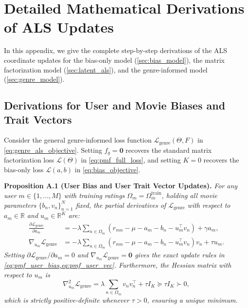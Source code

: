 \documentclass{article}
\theoremstyle{plain}
\theoremstyle{definition}
\begin{document}



\newpage
\appendix
\onecolumn

\section{Detailed Mathematical Derivations of ALS Updates}
\label{app:derivations}

In this appendix, we give the complete step-by-step derivations of the ALS coordinate updates for the bias-only model (\cref{sec:bias_model}), the matrix factorization model (\cref{sec:latent_als}), and the genre-informed model (\cref{sec:genre_model}).

\subsection{Derivations for User and Movie Biases and Trait Vectors}

Consider the general genre-informed loss function $\mathcal{L}_{\text{genre}}(\Theta, F)$ in \cref{eq:genre_als_objective}. Setting $f_g = \mathbf{0}$ recovers the standard matrix factorization loss $\mathcal{L}(\Theta)$ in \cref{eq:pmf_full_loss}, and setting $K = 0$ recovers the bias-only loss $\mathcal{L}(a,b)$ in \cref{eq:bias_objective}.

\textbf{Proposition A.1 (User Bias and User Trait Vector Updates).}
\emph{For any user $m \in \{1, \dots, M\}$ with training ratings $\Omega_m = \Omega_m^{\text{train}}$, holding all movie parameters $\{b_n, v_n\}_{n=1}^N$ fixed, the partial derivatives of $\mathcal{L}_{\text{genre}}$ with respect to $a_m \in \mathbb{R}$ and $u_m \in \mathbb{R}^K$ are:}
\begin{align}
\frac{\partial \mathcal{L}_{\text{genre}}}{\partial a_m} &= -\lambda \sum_{n \in \Omega_m} \left( r_{mn} - \mu - a_m - b_n - u_m^\top v_n \right) + \gamma a_m, \label{eq:app_grad_am} \\
\nabla_{u_m} \mathcal{L}_{\text{genre}} &= -\lambda \sum_{n \in \Omega_m} \left( r_{mn} - \mu - a_m - b_n - u_m^\top v_n \right) v_n + \tau u_m. \label{eq:app_grad_um}
\end{align}
\emph{Setting $\partial \mathcal{L}_{\text{genre}} / \partial a_m = 0$ and $\nabla_{u_m} \mathcal{L}_{\text{genre}} = \mathbf{0}$ gives the exact update rules in \cref{eq:pmf_user_bias,eq:pmf_user_vec}. Furthermore, the Hessian matrix with respect to $u_m$ is}
\begin{equation}
\nabla_{u_m}^2 \mathcal{L}_{\text{genre}} = \lambda \sum_{n \in \Omega_m} v_n v_n^\top + \tau I_K \succeq \tau I_K \succ 0,
\end{equation}
\emph{which is strictly positive-definite whenever $\tau > 0$, ensuring a unique minimum.}
\end{document}
